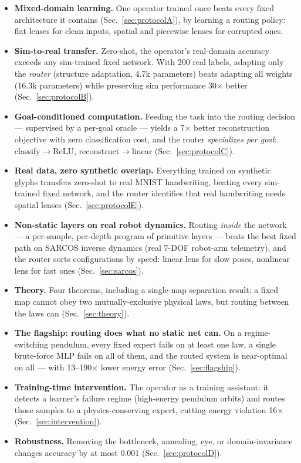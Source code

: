 \documentclass[11pt,a4paper]{article}
\begin{document}
\begin{itemize}[leftmargin=1.4em]
  \item \textbf{Mixed-domain learning.} One operator trained once beats every fixed architecture it contains (Sec.~\ref{sec:protocolA}), by learning a routing policy: flat lenses for clean inputs, spatial and piecewise lenses for corrupted ones.
  \item \textbf{Sim-to-real transfer.} Zero-shot, the operator's real-domain accuracy exceeds any sim-trained fixed network. With 200 real labels, adapting only the \emph{router} (structure adaptation, 4.7k parameters) beats adapting all weights (16.3k parameters) while preserving sim performance 30$\times$ better (Sec.~\ref{sec:protocolB}).
  \item \textbf{Goal-conditioned computation.} Feeding the task into the routing decision --- supervised by a per-goal oracle --- yields a 7$\times$ better reconstruction objective with zero classification cost, and the router \emph{specializes per goal}: classify$\to$ReLU, reconstruct$\to$linear (Sec.~\ref{sec:protocolC}).
  \item \textbf{Real data, zero synthetic overlap.} Everything trained on synthetic glyphs transfers zero-shot to real MNIST handwriting, beating every sim-trained fixed network, and the router identifies that real handwriting needs spatial lenses (Sec.~\ref{sec:protocolE}).
  \item \textbf{Non-static layers on real robot dynamics.} Routing \emph{inside} the network --- a per-sample, per-depth program of primitive layers --- beats the best fixed path on SARCOS inverse dynamics (real 7-DOF robot-arm telemetry), and the router sorts configurations by speed: linear lens for slow poses, nonlinear lens for fast ones (Sec.~\ref{sec:sarcos}).
  \item \textbf{Theory.} Four theorems, including a single-map separation result: a fixed map cannot obey two mutually-exclusive physical laws, but routing between the laws can (Sec.~\ref{sec:theory}).
  \item \textbf{The flagship: routing does what no static net can.} On a regime-switching pendulum, every fixed expert fails on at least one law, a single brute-force MLP fails on all of them, and the routed system is near-optimal on all --- with 13--190$\times$ lower energy error (Sec.~\ref{sec:flagship}).
  \item \textbf{Training-time intervention.} The operator as a training assistant: it detects a learner's failure regime (high-energy pendulum orbits) and routes those samples to a physics-conserving expert, cutting energy violation 16$\times$ (Sec.~\ref{sec:intervention}).
  \item \textbf{Robustness.} Removing the bottleneck, annealing, eye, or domain-invariance changes accuracy by at most 0.001 (Sec.~\ref{sec:protocolD}).
\end{itemize}
\end{document}
